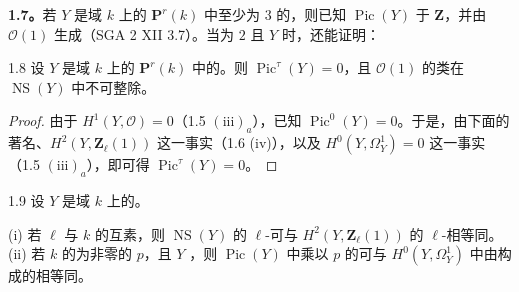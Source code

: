 \textbf{1.7。}若 $Y$ 是域 $k$ 上的 $\mathbf P^r(k)$ 中至少为 $3$ 的，则已知 $\operatorname{Pic}(Y)$ 于 $\mathbf Z$，并由 $\mathcal O(1)$ 生成（SGA 2 XII 3.7）。当为 $2$ 且 $Y$ 时，还能证明：
\begin{SGAresult}{}{1.8}
设 $Y$ 是域 $k$ 上的 $\mathbf P^r(k)$ 中的。则 $\operatorname{Pic}^\tau(Y)=0$，且 $\mathcal O(1)$ 的类在 $\operatorname{NS}(Y)$ 中不可整除。
\end{SGAresult}
\begin{proof}
由于 $H^1(Y,\mathcal O)=0$（1.5 $(\mathrm{iii})_a$），已知 $\operatorname{Pic}^0(Y)=0$。于是，由下面的著名、$H^2(Y,\mathbf Z_\ell(1))$ 这一事实（1.6 (iv)），以及 $H^0(Y,\Omega_Y^1)=0$ 这一事实（1.5 $(\mathrm{iii})_a$），即可得 $\operatorname{Pic}^\tau(Y)=0$。
\end{proof}
\begin{SGAresult}{}{1.9}
设 $Y$ 是域 $k$ 上的。

(i) 若 $\ell$ 与 $k$ 的互素，则 $\operatorname{NS}(Y)$ 的 $\ell$-可与 $H^2(Y,\mathbf Z_\ell(1))$ 的 $\ell$-相等同。
(ii) 若 $k$ 的为非零的 $p$，且 $Y$ ，则 $\operatorname{Pic}(Y)$ 中乘以 $p$ 的可与 $H^0(Y,\Omega_Y^1)$ 中由构成的相等同。
\end{SGAresult}
